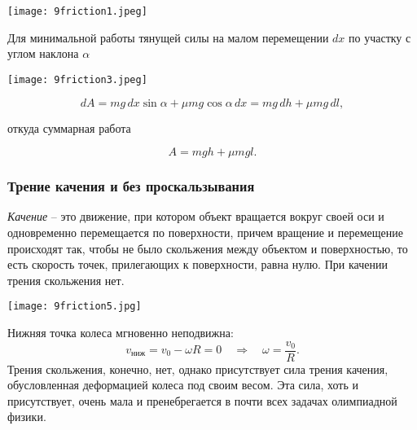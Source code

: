\documentclass[12pt, a4paper]{article}%
\begin{document}
\begin{center}
\texttt{[image: 9friction1.jpeg]}
\label{fig:mpr}
\end{center}

Для минимальной работы тянущей силы на малом перемещении $dx$ по участку с углом наклона $\alpha$

\begin{center}
\texttt{[image: 9friction3.jpeg]}
\label{fig:mpr}
\end{center}

\[
dA = mg\,dx\sin\alpha+\mu mg\cos\alpha\, dx = mg\,dh +\mu mg\,dl,
\]

откуда суммарная работа

\[
A = mgh+\mu mgl.
\]


\subsubsection*{Трение качения и без проскальзывания}
\textit{Качение} – это движение, при котором объект вращается вокруг своей оси и одновременно перемещается по поверхности, причем вращение и перемещение происходят так, чтобы не было скольжения между объектом и поверхностью, то есть скорость точек, прилегающих к поверхности, равна нулю.
При качении трения скольжения нет.

\begin{center}
\texttt{[image: 9friction5.jpg]}
\label{fig:mpr}
\end{center}

Нижняя точка колеса мгновенно неподвижна:
\[
v_{\mathrm{ниж}} = v_0 - \omega R = 0
\quad\Longrightarrow\quad
\omega = \frac{v_0}{R}.
\]
Трения скольжения, конечно, нет, однако присутствует сила трения качения, обусловленная деформацией колеса под своим весом. Эта сила, хоть и присутствует, очень мала и пренебрегается в почти всех задачах олимпиадной физики. 
\end{document}
